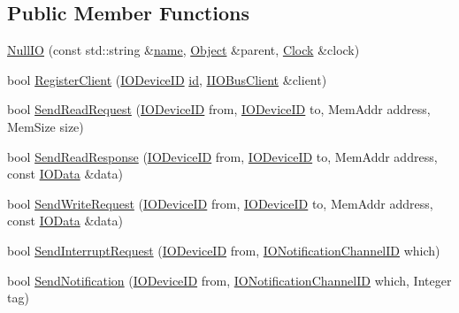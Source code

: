 \subsection*{Public Member Functions}
\begin{DoxyCompactItemize}
\item 
\hyperlink{class_simulator_1_1_null_i_o_ab084bb8032f5a515f423aa868092cd42}{Null\+I\+O} (const std\+::string \&\hyperlink{mtconf_8c_a8f8f80d37794cde9472343e4487ba3eb}{name}, \hyperlink{class_simulator_1_1_object}{Object} \&parent, \hyperlink{class_simulator_1_1_clock}{Clock} \&clock)
\item 
bool \hyperlink{class_simulator_1_1_null_i_o_aff954205e21154bc33fbe82aa2f1e783}{Register\+Client} (\hyperlink{namespace_simulator_a3493d987c866ad6b8aaa704c42502db0}{I\+O\+Device\+I\+D} \hyperlink{mtconf_8c_aa3185401f04d30bd505daebf48c39cc5}{id}, \hyperlink{class_simulator_1_1_i_i_o_bus_client}{I\+I\+O\+Bus\+Client} \&client)
\item 
bool \hyperlink{class_simulator_1_1_null_i_o_a025eb93485d5ee4e79e418f447858965}{Send\+Read\+Request} (\hyperlink{namespace_simulator_a3493d987c866ad6b8aaa704c42502db0}{I\+O\+Device\+I\+D} from, \hyperlink{namespace_simulator_a3493d987c866ad6b8aaa704c42502db0}{I\+O\+Device\+I\+D} to, Mem\+Addr address, Mem\+Size size)
\item 
bool \hyperlink{class_simulator_1_1_null_i_o_acb667140bec69e4cd0cb81d7fabff57e}{Send\+Read\+Response} (\hyperlink{namespace_simulator_a3493d987c866ad6b8aaa704c42502db0}{I\+O\+Device\+I\+D} from, \hyperlink{namespace_simulator_a3493d987c866ad6b8aaa704c42502db0}{I\+O\+Device\+I\+D} to, Mem\+Addr address, const \hyperlink{struct_simulator_1_1_i_o_data}{I\+O\+Data} \&data)
\item 
bool \hyperlink{class_simulator_1_1_null_i_o_aacc769e75a91a3e97963289fabec8a6c}{Send\+Write\+Request} (\hyperlink{namespace_simulator_a3493d987c866ad6b8aaa704c42502db0}{I\+O\+Device\+I\+D} from, \hyperlink{namespace_simulator_a3493d987c866ad6b8aaa704c42502db0}{I\+O\+Device\+I\+D} to, Mem\+Addr address, const \hyperlink{struct_simulator_1_1_i_o_data}{I\+O\+Data} \&data)
\item 
bool \hyperlink{class_simulator_1_1_null_i_o_a34a7220412e9c1a8fc48d901cad192b0}{Send\+Interrupt\+Request} (\hyperlink{namespace_simulator_a3493d987c866ad6b8aaa704c42502db0}{I\+O\+Device\+I\+D} from, \hyperlink{namespace_simulator_a951e1bf3ee91c11c980382a7bcbba287}{I\+O\+Notification\+Channel\+I\+D} which)
\item 
bool \hyperlink{class_simulator_1_1_null_i_o_a29305b8ba8c3a4ac26d6f4f09a8bc57f}{Send\+Notification} (\hyperlink{namespace_simulator_a3493d987c866ad6b8aaa704c42502db0}{I\+O\+Device\+I\+D} from, \hyperlink{namespace_simulator_a951e1bf3ee91c11c980382a7bcbba287}{I\+O\+Notification\+Channel\+I\+D} which, Integer tag)

\end{DoxyCompactItemize}

